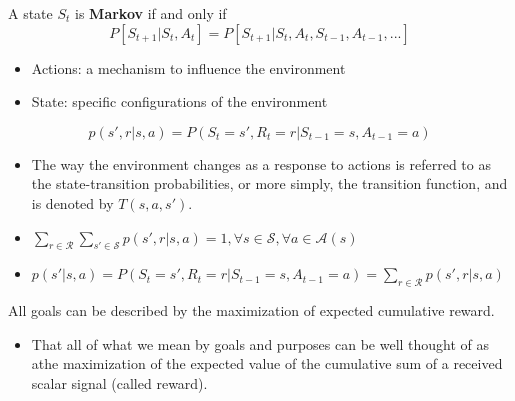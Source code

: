 \begin{definition}
	A state $S_t$ is \textbf{Markov} if and only if 
	$$P[S_{t+1}|S_t, A_t] = P[S_{t+1}|S_t, A_t, S_{t-1},A_{t-1},...]$$
\end{definition}
\begin{itemize}
	\item Actions: a mechanism to influence the environment
	\item State: specific configurations of the environment
\end{itemize}

\begin{definition}
	$$p(s',r|s,a) = P(S_t=s',R_t=r|S_{t-1}=s,A_{t-1}=a)$$
\end{definition}
\begin{itemize}
	\item The way the environment changes as a response to actions is referred to as the state-transition probabilities, or more simply, the transition function, and is denoted by $T(s,a,s')$.
	\item $\sum_{r\in \mathcal{R}}\sum_{s'\in \mathcal{S}}p(s',r|s,a) = 1, \forall s \in \mathcal{S}, \forall a\in \mathcal{A}(s)$
	\item $p(s'|s,a)=P(S_t=s',R_t=r|S_{t-1}=s,A_{t-1}=a)=\sum_{r\in \mathcal{R}}p(s',r|s,a)$
\end{itemize}

\begin{definition}
	All goals can be described by the maximization of expected cumulative reward.
\end{definition}
\begin{itemize}
	\item That all of what we mean by goals and purposes can be well thought of as athe maximization of the expected value of the cumulative sum of a received scalar signal (called reward).
\end{itemize}

